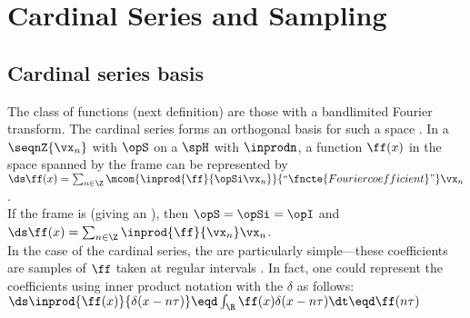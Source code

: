 
\section{Cardinal Series and Sampling}
\subsection{Cardinal series basis}
\label{sec:cardinal}
The  class of functions (next definition) are those with a bandlimited Fourier transform.
The cardinal series forms an orthogonal basis for such a space .
In a  $\seqnZ{\vx_n}$ with  $\opS$ on a  $\spH$
with  $\inprodn$, 
a function $\ff(x)$ in the space spanned by the frame can be represented by
\\\indentx$\ds\ff(x) = \sum_{n\in\Z} \mcom{\inprod{\ff}{\opSi\vx_n}}{``\fncte{Fourier coefficient}"}\vx_n$.\\
If the frame is  (giving an ), then $\opS=\opSi=\opI$ and 
\\\indentx$\ds\ff(x) = \sum_{n\in\Z} \inprod{\ff}{\vx_n}\vx_n$.\\
In the case of the cardinal series, 
the  are particularly 
simple---these coefficients are samples of $\ff$ taken at regular intervals .
In fact, one could represent the coefficients using inner product notation with the 
 $\delta$  as
follows:
\\\indentx$\ds\inprod{\ff(x)}{\delta(x-n\tau)} \eqd \int_{\R} \ff(x)\delta(x-n\tau) \dt \eqd \ff(n\tau)$

